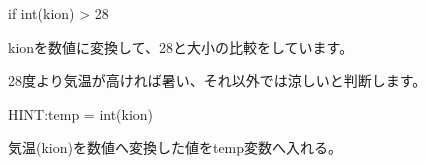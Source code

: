if int(kion) {\textgreater} 28

kionを数値に変換して、28と大小の比較をしています。

28度より気温が高ければ暑い、それ以外では涼しいと判断します。


\begin{tcolorbox}[title=\useOmetoi,breakable]\label{Q:amedas4}
  \begin{enumerate}
    HINT:temp = int(kion)
    
    気温(kion)を数値へ変換した値をtemp変数へ入れる。
  \end{enumerate}
\end{tcolorbox}




\begin{tcolorbox}[title=\useOmetoi,breakable]\label{Q:amedas5}
  \begin{enumerate}
  \end{enumerate}
\end{tcolorbox}


\clearpage

\begin{tcolorbox}[title=\useOmetoi,breakable]\label{Q:amedas6}
  \begin{enumerate}
  \end{enumerate}
\end{tcolorbox}

